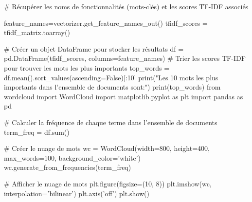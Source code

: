# Récupérer les noms de fonctionnalités (mots-clés) et les scores TF-IDF associés

feature_names=vectorizer.get_feature_names_out()
tfidf_scores = tfidf_matrix.toarray()

# Créer un objet DataFrame pour stocker les résultats
df = pd.DataFrame(tfidf_scores, columns=feature_names)
# Trier les scores TF-IDF pour trouver les mots les plus importants
top_words = df.mean().sort_values(ascending=False)[:10]
print("Les 10 mots les plus importants dans l'ensemble de documents sont:\n")
print(top_words)
from wordcloud import WordCloud
import matplotlib.pyplot as plt
import pandas as pd




# Calculer la fréquence de chaque terme dans l'ensemble de documents
term_freq = df.sum()

# Créer le nuage de mots
wc = WordCloud(width=800, height=400, max_words=100, background_color='white')
wc.generate_from_frequencies(term_freq)

# Afficher le nuage de mots
plt.figure(figsize=(10, 8))
plt.imshow(wc, interpolation='bilinear')
plt.axis('off')
plt.show()